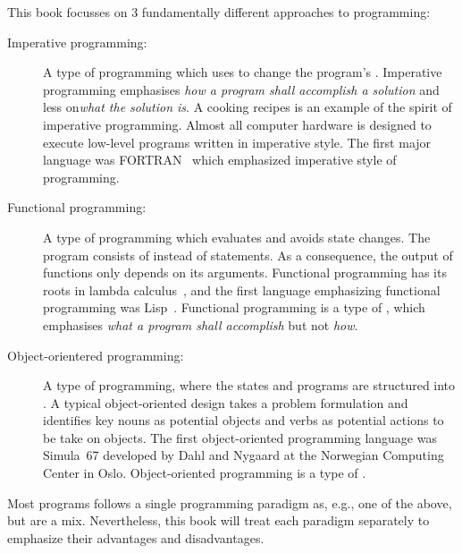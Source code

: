 This book focusses on 3 fundamentally different approaches to programming: 
\begin{description}
\item[Imperative programming:] A type of programming which uses  to change the program's . Imperative programming emphasises \emph{how a program shall accomplish a solution} and less on\emph{what the solution is}. A cooking recipes is an example of the spirit of imperative programming. Almost all computer hardware is designed to execute low-level programs written in imperative style. The first major language was FORTRAN~\cite{backus54} which emphasized imperative style of programming.
\item[Functional programming:] A type of programming which evaluates  and avoids state changes. The program consists of  instead of statements. As a consequence, the output of functions only depends on its arguments. Functional programming has its roots in lambda calculus~\cite{church32}, and the first language emphasizing functional programming was Lisp~\cite{mccarthy60}. Functional programming is a type of , which emphasises \emph{what a program shall accomplish} but not \emph{how}.
\item[Object-orientered programming:] A type of programming, where the states and programs are structured into . A typical object-oriented design takes a problem formulation and identifies key nouns as potential objects and verbs as potential actions to be take on objects. The first object-oriented programming language was Simula~67 developed by Dahl and Nygaard at the Norwegian Computing Center in Oslo. Object-oriented programming is a type of .
\end{description}
Most programs follows a single programming paradigm as, e.g., one of the above, but are a mix. Nevertheless, this book will treat each paradigm separately to emphasize their advantages and disadvantages.

